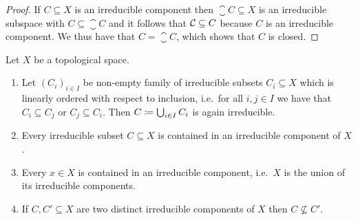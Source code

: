 \begin{proof}
  If $C \subseteq X$ is an irreducible component then $\closure{C} \subseteq X$ is an irreducible subspace with $C \subseteq \closure{C}$ and it follows that $\mathcal{C} \subseteq C$ because $C$ is an irreducible component.
  We thus have that $C = \closure{C}$, which shows that $C$ is closed.
\end{proof}


\begin{proposition}
  \label{proposition: irreducible components for alls topological spaces}
  Let $X$ be a topological space.
  \begin{enumerate}
    \item
      Let $(C_i)_{i \in I}$ be non-empty family of irreducible subsets $C_i \subseteq X$ which is linearly ordered with respect to inclusion, i.e.\ for all $i, j \in I$ we have that $C_i \subseteq C_j$ or $C_j \subseteq C_i$.
      Then $C \coloneqq \bigcup_{i \in I} C_i$ is again irreducible.
    \item
      Every irreducible subset $C \subseteq X$ is contained in an irreducible component of $X$.
    \item
      Every $x \in X$ is contained in an irreducible component, i.e.\ $X$ is the union of its irreducible components.
    \item
      If $C, C' \subseteq X$ are two distinct irreducible components of $X$ then $C \nsubseteq C'$.
  \end{enumerate}
\end{proposition}


